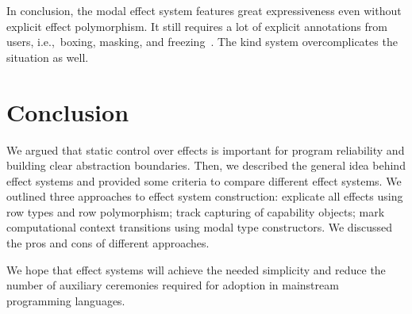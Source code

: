 \documentclass[conference]{IEEEtran}
\begin{document}
    In conclusion, the modal effect system features great expressiveness even without explicit effect polymorphism.
    It still requires a lot of explicit annotations from users, i.e.,\ boxing, masking, and freezing~\cite{emrich2020freezeml}.
    The kind system overcomplicates the situation as well.


    \section{Conclusion}

    We argued that static control over effects is important for program reliability and building clear abstraction boundaries.
    Then, we described the general idea behind effect systems and provided some criteria to compare different effect systems.
    We outlined three approaches to effect system construction: explicate all effects using row types and row polymorphism; track capturing of capability objects; mark computational context transitions using modal type constructors.
    We discussed the pros and cons of different approaches.

    We hope that effect systems will achieve the needed simplicity and reduce the number of auxiliary ceremonies required for adoption in mainstream programming languages.


%


    
    
\end{document}
